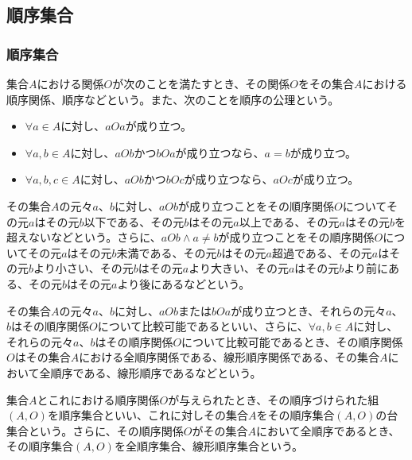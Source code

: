 \documentclass[dvipdfmx]{jsarticle}
\begin{document}
\subsection{順序集合}%
\subsubsection{順序集合}%
\begin{axs}[順序の公理]
集合$A$における関係$O$が次のことを満たすとき、その関係$O$をその集合$A$における順序関係、順序などという。また、次のことを順序の公理という。
\begin{itemize}
\item
  $\forall a \in A$に対し、$aOa$が成り立つ。
\item
  $\forall a,b \in A$に対し、$aOb$かつ$bOa$が成り立つなら、$a = b$が成り立つ。
\item
  $\forall a,b,c \in A$に対し、$aOb$かつ$bOc$が成り立つなら、$aOc$が成り立つ。
\end{itemize}
\end{axs}
\begin{dfn}
その集合$A$の元々$a$、$b$に対し、$aOb$が成り立つことをその順序関係$O$についてその元$a$はその元$b$以下である、その元$b$はその元$a$以上である、その元$a$はその元$b$を超えないなどという。さらに、$aOb \land a \neq b$が成り立つことをその順序関係$O$についてその元$a$はその元$b$未満である、その元$b$はその元$a$超過である、その元$a$はその元$b$より小さい、その元$b$はその元$a$より大きい、その元$a$はその元$b$より前にある、その元$b$はその元$a$より後にあるなどという。
\end{dfn}
\begin{dfn}
その集合$A$の元々$a$、$b$に対し、$aOb$または$bOa$が成り立つとき、それらの元々$a$、$b$はその順序関係$O$について比較可能であるといい、さらに、$\forall a,b \in A$に対し、それらの元々$a$、$b$はその順序関係$O$について比較可能であるとき、その順序関係$O$はその集合$A$における全順序関係である、線形順序関係である、その集合$A$において全順序である、線形順序であるなどという。
\end{dfn}
\begin{dfn}
集合$A$とこれにおける順序関係$O$が与えられたとき、その順序づけられた組$(A,O)$を順序集合といい、これに対しその集合$A$をその順序集合$(A,O)$の台集合という。さらに、その順序関係$O$がその集合$A$において全順序であるとき、その順序集合$(A,O)$を全順序集合、線形順序集合という。
\end{dfn}
\end{document}
